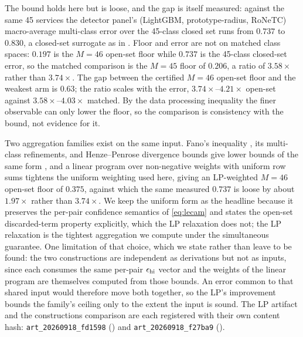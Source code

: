 The bound holds here but is loose, and the gap is itself measured: against the
same 45 services the detector panel's (LightGBM, prototype-radius, RoNeTC)
macro-average multi-class error over the 45-class closed set runs from $0.737$ to
$0.830$, a closed-set surrogate as in .
Floor and error are not on matched class spaces: $0.197$ is the $M{=}46$ open-set
floor while $0.737$ is the 45-class closed-set error, so the matched comparison is
the $M{=}45$ floor of $0.206$, a ratio of $3.58\times$ rather than $3.74\times$.
The gap between the certified $M{=}46$ open-set floor and the weakest arm is
$0.63$; the
ratio scales with the error, $3.74\times$--$4.21\times$ open-set against
$3.58\times$--$4.03\times$ matched.
By the data processing inequality the finer observable can only lower the floor,
so the comparison is consistency with the bound, not evidence for it.

Two aggregation families exist on the same input. Fano's inequality
\citep{fano1961transmission}, its multi-class refinements, and Henze--Penrose
divergence bounds give lower bounds of the same form
\citep{berisha2016empirically,sekeh2019learning}, and a linear program over
non-negative weights with uniform row sums tightens the uniform weighting used
here, giving an LP-weighted $M{=}46$ open-set floor of $0.375$, against which
the same measured $0.737$ is loose
by about $1.97\times$ rather than $3.74\times$. We keep the uniform form as the
headline because it preserves the per-pair confidence semantics of
\eqref{eq:lecam} and states the open-set discarded-term property explicitly, which
the LP relaxation does not; the LP relaxation is
the tightest aggregation we compute under the simultaneous guarantee. One
limitation of that choice, which we state rather than leave to be found: the two
constructions
are independent as derivations but not as inputs, since each consumes the
same per-pair $\epsilon_{\mathrm{hi}}$ vector and the weights of the linear program are
themselves computed from those bounds. An error common to that shared input
would therefore move both together, so the LP's improvement bounds the family's
ceiling only to the extent the input is sound. The LP artifact and the
constructions comparison are each registered with their own content hash:
\texttt{art\_20260918\_fd1598}
(\texttt{})
and \texttt{art\_20260918\_f27ba9}
(\texttt{}).

